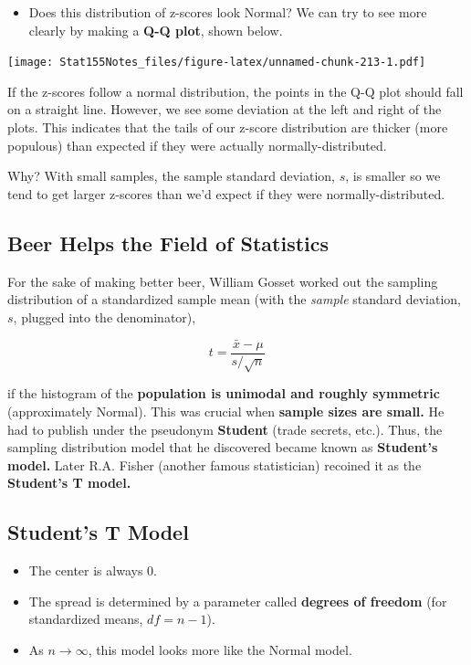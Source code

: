 \documentclass[]{book}
\providecommand{\tightlist}{%
  \setlength{\itemsep}{0pt}\setlength{\parskip}{0pt}}
\begin{document}
\begin{itemize}
\tightlist
\item
  Does this distribution of z-scores look Normal? We can try to see more clearly by making a \textbf{Q-Q plot}, shown below.
\end{itemize}

\texttt{[image: Stat155Notes\_files/figure-latex/unnamed-chunk-213-1.pdf]}

If the z-scores follow a normal distribution, the points in the Q-Q plot should fall on a straight line. However, we see some deviation at the left and right of the plots. This indicates that the tails of our z-score distribution are thicker (more populous) than expected if they were actually normally-distributed.

Why? With small samples, the sample standard deviation, \(s\), is smaller so we tend to get larger z-scores than we'd expect if they were normally-distributed.

\hypertarget{beer-helps-the-field-of-statistics}{%
\subsection{Beer Helps the Field of Statistics}\label{beer-helps-the-field-of-statistics}}

For the sake of making better beer, William Gosset worked out the sampling distribution of a standardized sample mean (with the \emph{sample} standard deviation, \(s\), plugged into the denominator),

\[t = \frac{\bar{x} - \mu}{s/\sqrt{n}}\]

if the histogram of the \textbf{population is unimodal and roughly symmetric} (approximately Normal). This was crucial when \textbf{sample sizes are small.} He had to publish under the pseudonym \textbf{Student} (trade secrets, etc.). Thus, the sampling distribution model that he discovered became known as \textbf{Student's model.} Later R.A. Fisher (another famous statistician) recoined it as the \textbf{Student's T model.}

\hypertarget{students-t-model}{%
\subsection{Student's T Model}\label{students-t-model}}

\begin{itemize}
\tightlist
\item
  The center is always 0.
\item
  The spread is determined by a parameter called \textbf{degrees of freedom} (for standardized means, \(df = n - 1\)).
\item
  As \(n\rightarrow\infty\), this model looks more like the Normal model.
\end{itemize}
\end{document}
